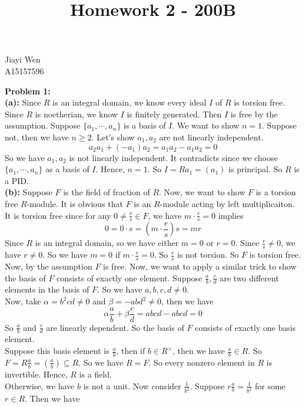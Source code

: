 \documentclass[12pt]{amsart}
\begin{document}
\title{Homework 2 - 200B}
\maketitle
\begin{center}
    Jiayi Wen\\
    A15157596
\end{center}
\textbf{Problem 1:}\\
\textbf{(a):} Since $R$ is an integral domain, we know every ideal $I $ of $R$ is torsion free. Since $R$ is noetherian, we know $I$ is finitely generated. Then $I$ is free by the assumption. Suppose $\{a_1,\cdots,a_n\}$ is a basis of $I$. We want to show $n=1$. Suppose not, then we have $n\geq 2$. Let's show $a_1,a_2$ are not linearly independent.
\[a_2a_1+(-a_1)a_2=a_1a_2-a_1a_2=0\] 
So we have $a_1,a_2$ is not linearly independent. It contradicts since we choose $\{a_1,\cdots,a_n\}$ as a basis of $I$. Hence, $n=1$. So $I=Ra_1=(a_1)$ is principal. So $R$ is a PID.\\
\textbf{(b):} Suppose $F$ is the field of fraction of $R$. Now, we want to show $F$ is a torsion free $R$-module. It is obvious that $F$ is an $R$-module acting by left multiplicaiton. It is torsion free since for any $0\neq \frac{r}{s}\in F$, we have $m\cdot \frac{r}{s}=0$ implies 
\[0=0\cdot s=(m\cdot \frac{r}{s})s=mr\]
Since $R$ is an integral domain, so we have either $m=0$ or $r=0$. Since $\frac{r}{s}\neq 0$, we have $r\neq 0$. So we have $m=0$ if $m\cdot \frac{r}{s}=0$. So $\frac{r}{s}$ is not torsion. So $F$ is torsion free.\\
Now, by the assumption $F$ is free. Now, we want to apply a similar trick to show the basis of $F$ consists of exactly one element. Suppose $\frac{a}{b},\frac{c}{d}$ are two different elements in the basis of $F$. So we have $a,b,c,d\neq 0$.\\
Now, take $\alpha=b^2cd\neq 0$ and $\beta=-abd^2\neq 0$, then we have  
\[\alpha \frac{a}{b}+\beta\frac{c}{d}=abcd-abcd=0\]
So $\frac{a}{b}$ and $\frac{c}{d}$ are linearly dependent. So the basis of $F$ consists of exactly one basis element.\\
Suppose this basis element is $\frac{a}{b}$, then if $b\in R^\times$, then we have $\frac{a}{b}\in R$. So $F=R\frac{a}{b}=(\frac{a}{b})\subseteq R$. So we have $R=F$. So every nonzero element in $R$ is invertible. Hence, $R$ is a field.\\
Otherwise, we have $b$ is not a unit. Now consider $\frac{1}{b^2}$. Suppose $r\frac{a}{b}=\frac{1}{b^2}$ for some $r\in R$. Then we have 
\end{document}

